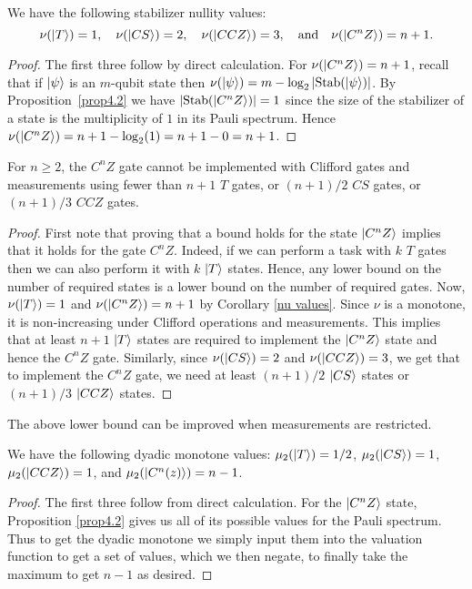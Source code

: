 \documentclass[12pt]{dalthesis}
\begin{document}
\begin{corollary}
\label{nu values}
We have the following stabilizer nullity values: 
\[
\nu (\ket{T}) = 1, \quad \nu (\ket{CS}) = 2, \quad \nu (\ket{CCZ}) = 3, \quad \mbox{and} \quad \nu (\ket{C^n Z}) = n+1.
\]
\end{corollary}
\begin{proof}

The first three follow by direct calculation. For $\nu (\ket{C^n Z}) =
n+1$, recall that if $\ket{\psi}$ is an $m$-qubit state then $\nu
(\ket{\psi}) = m - \log_2|\mathrm{Stab}(\ket{\psi})|$. By
Proposition~\ref{prop4.2} we have $|\mathrm{Stab}(\ket{C^n Z})| = 1$ since the
size of the stabilizer of a state is the multiplicity of $1$ in its
Pauli spectrum. Hence $\nu (\ket{C^n Z}) = n+1 - \log_2 (1) = n+1-0 =
n+1$.
\end{proof}

\begin{proposition}
\label{nullity(C^nZ) LB}
For $n \geq 2$, the $C^n Z$ gate cannot be implemented with Clifford gates and measurements using fewer than $n+1$ $T$ gates, or $(n+1)/2$ $CS$ gates, or $(n+1)/3$ $CCZ$ gates.
\end{proposition}

\begin{proof}
First note that proving that a bound holds for the state $\ket{C^n Z}$ implies that it holds for the gate $C^n Z$. Indeed, if we can perform a task with $k$ $T$ gates then we can also perform it with $k$ $\ket{T}$ states. Hence, any lower bound on the number of required states is a lower bound on the number of required gates. Now, $\nu (\ket{T}) = 1$ and $\nu (\ket{C^n Z}) = n+1$ by Corollary \ref{nu values}. Since $\nu$ is a monotone, it is non-increasing under Clifford operations and measurements. This implies that at least $n+1$ $\ket{T}$ states are required to implement the $\ket{C^n Z}$ state and hence the $C^n Z$ gate. Similarly, since $\nu (\ket{CS}) = 2$ and $\nu (\ket{CCZ}) = 3$, we get that to implement the $C^n Z$ gate, we need at least $(n+1)/2$ $\ket{CS}$ states or $(n+1)/3$ $\ket{CCZ}$ states.
\end{proof}

The above lower bound can be improved when measurements are restricted.

\begin{corollary}
\label{dyadic values}
We have the following dyadic monotone values: $\mu_2 (\ket{T}) = 1/2$, $\mu_2 (\ket{CS}) = 1$, $\mu_2 (\ket{CCZ}) = 1$, and $\mu_2 (\ket{C^n(z)}) = n-1$.
\end{corollary}
\begin{proof}
The first three follow from direct calculation. For the $\ket{C^nZ}$ state, Proposition \ref{prop4.2} gives us all of its possible values for the Pauli spectrum. Thus to get the dyadic monotone we simply input them into the valuation function to get a set of values, which we then negate, to finally take the maximum to get $n-1$ as desired.
\end{proof}
\end{document}
